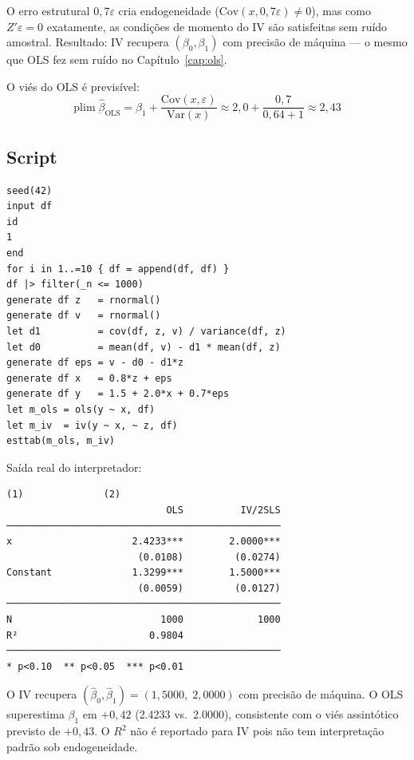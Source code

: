 O erro estrutural $0{,}7\varepsilon$ cria endogeneidade ($\mathrm{Cov}(x,0{,}7\varepsilon) \neq 0$),
mas como $Z'\varepsilon = 0$ exatamente, as condições de momento do IV são
satisfeitas sem ruído amostral. Resultado: IV recupera $(\beta_0, \beta_1)$
com precisão de máquina — o mesmo que OLS fez sem ruído no Capítulo~\ref{cap:ols}.

O viés do OLS é previsível:
\[
  \mathrm{plim}\;\hat\beta_{\mathrm{OLS}}
  = \beta_1 + \frac{\mathrm{Cov}(x,\varepsilon)}{\mathrm{Var}(x)}
  \approx 2{,}0 + \frac{0{,}7}{0{,}64 + 1}
  \approx 2{,}43
\]

\subsection*{Script}

\begin{lstlisting}[caption={DGP com endogeneidade — OLS vs.\ IV}]
seed(42)
input df
id
1
end
for i in 1..=10 { df = append(df, df) }
df |> filter(_n <= 1000)
generate df z   = rnormal()
generate df v   = rnormal()
let d1          = cov(df, z, v) / variance(df, z)
let d0          = mean(df, v) - d1 * mean(df, z)
generate df eps = v - d0 - d1*z
generate df x   = 0.8*z + eps
generate df y   = 1.5 + 2.0*x + 0.7*eps
let m_ols = ols(y ~ x, df)
let m_iv  = iv(y ~ x, ~ z, df)
esttab(m_ols, m_iv)
\end{lstlisting}

\noindent Saída real do interpretador:

\begin{lstlisting}[language={}, basicstyle=\ttfamily\small,
  frame=none, numbers=none, backgroundcolor=\color{codbg},
  xleftmargin=0pt, xrightmargin=0pt, breaklines=false]
                            (1)              (2)
                            OLS          IV/2SLS
────────────────────────────────────────────────
x                     2.4233***        2.0000***
                       (0.0108)         (0.0274)
Constant              1.3299***        1.5000***
                       (0.0059)         (0.0127)
────────────────────────────────────────────────
N                          1000             1000
R²                       0.9804
────────────────────────────────────────────────
* p<0.10  ** p<0.05  *** p<0.01
\end{lstlisting}

O IV recupera $(\hat\beta_0, \hat\beta_1) = (1{,}5000,\; 2{,}0000)$ com precisão
de máquina. O OLS superestima $\beta_1$ em $+0{,}42$ (2.4233 vs.\ 2.0000),
consistente com o viés assintótico previsto de $+0{,}43$.
O $R^2$ não é reportado para IV pois não tem interpretação padrão sob endogeneidade.

